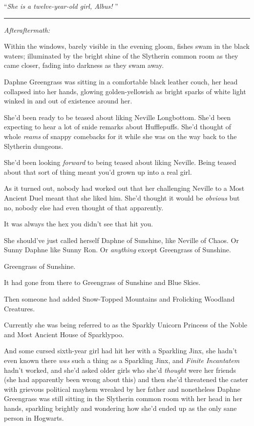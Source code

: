 ``\emph{She is a twelve-year-old girl, Albus!} ''

\begin{center}\rule{3in}{0.4pt}\end{center}

\emph{Afteraftermath:}

Within the windows, barely visible in the evening gloom, fishes swam in
the black waters; illuminated by the bright shine of the Slytherin
common room as they came closer, fading into darkness as they swam away.

Daphne Greengrass was sitting in a comfortable black leather couch, her
head collapsed into her hands, glowing golden-yellowish as bright sparks
of white light winked in and out of existence around her.

She'd been ready to be teased about liking Neville Longbottom. She'd
been expecting to hear a lot of snide remarks about Hufflepuffs. She'd
thought of whole \emph{reams} of snappy comebacks for it while she was
on the way back to the Slytherin dungeons.

She'd been looking \emph{forward} to being teased about liking Neville.
Being teased about that sort of thing meant you'd grown up into a real
girl.

As it turned out, nobody had worked out that her challenging Neville to
a Most Ancient Duel meant that she liked him. She'd thought it would be
\emph{obvious} but no, nobody else had even thought of that apparently.

It was always the hex you didn't see that hit you.

She should've just called herself Daphne of Sunshine, like Neville of
Chaos. Or Sunny Daphne like Sunny Ron. Or \emph{anything} except
Greengrass of Sunshine.

Greengrass of Sunshine.

It had gone from there to Greengrass of Sunshine and Blue Skies.

Then someone had added Snow-Topped Mountains and Frolicking Woodland
Creatures.

Currently she was being referred to as the Sparkly Unicorn Princess of
the Noble and Most Ancient House of Sparklypoo.

And some cursed sixth-year girl had hit her with a Sparkling Jinx, she
hadn't even known there \emph{was} such a thing as a Sparkling Jinx, and
\emph{Finite Incantatem} hadn't worked, and she'd asked older girls who
she'd \emph{thought} were her friends (she had apparently been wrong
about this) and then she'd threatened the caster with grievous political
mayhem wreaked by her father and nonetheless Daphne Greengrass was still
sitting in the Slytherin common room with her head in her hands,
sparkling brightly and wondering how she'd ended up as the only sane
person in Hogwarts.

